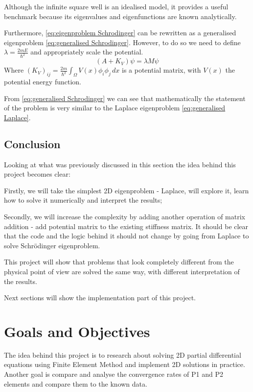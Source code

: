 \documentclass[acmsmall,screen]{MapleTrans}
\begin{document}
Although the infinite square well is an idealised model, it provides a useful benchmark because its eigenvalues and eigenfunctions are known analytically.

Furthermore, \eqref{eq:eigenproblem Schrodinger} can be rewritten as a generalised eigenproblem \eqref{eq:generalised Schrodinger}. However, to do so we need to define $\lambda = \frac{2mE}{\hbar^2}$ and appropriately scale the potential.
\begin{equation}
    (A + K_V)\psi = \lambda M\psi
    \label{eq:generalised Schrodinger}
\end{equation}
Where $(K_V)_{ij} = \frac{2m}{\hbar^2} \int_\Omega V(x)\phi_i\phi_j \, dx$ is a potential matrix, with $V(x)$ the potential energy function.

From \eqref{eq:generalised Schrodinger} we can see that mathematically the statement of the problem is very similar to the Laplace eigenproblem \eqref{eq:generalised Laplace}.


\subsection{Conclusion}
Looking at what was previously discussed in this section the idea behind this project becomes clear: 

Firstly, we will take the simplest 2D eigenproblem - Laplace, will explore it, learn how to solve it numerically and interpret the results;

Secondly, we will increase the complexity by adding another operation of matrix addition - add potential matrix to the existing stiffness matrix. It should be clear that the code and the logic behind it should not change by going from Laplace to solve Schr\"{o}dinger eigenproblem.

This project will show that problems that look completely different from the physical point of view are solved the same way, with different interpretation of the results. 

Next sections will show the implementation part of this project.



\section{Goals and Objectives}

The idea behind this project is to research about solving 2D partial differential equations using Finite Element Method and implement 2D solutions in practice. Another goal is compare and analyse the convergence rates of P1 and P2 elements and compare them to the known data.
\end{document}
